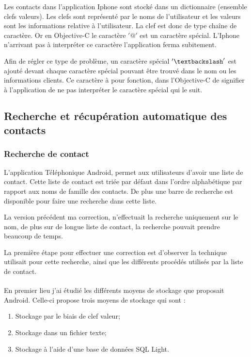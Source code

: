Les contacts dans l'application Iphone sont stocké dans un dictionnaire (ensemble clefs valeurs). Les clefs sont représenté par le noms de l'utilisateur et les valeurs sont les informations relative à l'utilisateur. La clef est donc de type chaîne de caractère. Or en Objective-C le caractère $'@'$ est un caractère spécial. L'Iphone n'arrivant pas à interpréter ce caractère l'application ferma subitement.

Afin de régler ce type de problème, un caractère spécial $'\textbackslash'$ est ajouté devant chaque caractère spécial pouvant être trouvé dans le nom ou les informations clients. Ce caractère à pour fonction, dans l'Objective-C de signifier à l'application de ne pas interpréter le caractère spécial qui le suit. 

\subsection{Recherche et récupération automatique des contacts}


\subsubsection{Recherche de contact}

L'application Téléphonique Android, permet aux utilisateurs d'avoir une liste de contact. Cette liste de contact est triée par défaut dans l'ordre alphabétique par rapport aux noms de famille des contacts. De plus une barre de recherche est disponible pour faire une recherche dans cette liste.

La version précédent ma correction, n'effectuait la recherche uniquement sur le nom, de plus sur de longue liste de contact, la recherche pouvait prendre beaucoup de temps.

La première étape pour effectuer une correction est d'observer la technique utilisait pour cette recherche, ainsi que les différents procédés utilisés par la liste de contact.\\\\



En premier lieu j'ai étudié les différents moyens de stockage que proposait Android. Celle-ci propose trois moyens de stockage qui sont :

\begin{enumerate}
	\item Stockage par le biais de clef valeur;
	\item Stockage dans un fichier texte;
	\item Stockage à l'aide d'une base de données SQL Light.
\end{enumerate}


